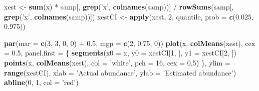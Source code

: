 \documentclass[]{article}
\newenvironment{Shaded}{\begin{snugshade}}{\end{snugshade}}
\newcommand{\KeywordTok}[1]{\textcolor[rgb]{0.13,0.29,0.53}{\textbf{{#1}}}}
\newcommand{\DataTypeTok}[1]{\textcolor[rgb]{0.13,0.29,0.53}{{#1}}}
\newcommand{\DecValTok}[1]{\textcolor[rgb]{0.00,0.00,0.81}{{#1}}}
\newcommand{\FloatTok}[1]{\textcolor[rgb]{0.00,0.00,0.81}{{#1}}}
\newcommand{\StringTok}[1]{\textcolor[rgb]{0.31,0.60,0.02}{{#1}}}
\newcommand{\NormalTok}[1]{{#1}}
\begin{document}
\begin{Shaded}
\begin{Highlighting}[]
\NormalTok{xest <-}\StringTok{ }\KeywordTok{sum}\NormalTok{(x) *}\StringTok{ }\NormalTok{samp[, }\KeywordTok{grep}\NormalTok{(}\StringTok{'x'}\NormalTok{, }\KeywordTok{colnames}\NormalTok{(samp))] /}\StringTok{ }
\StringTok{    }\KeywordTok{rowSums}\NormalTok{(samp[, }\KeywordTok{grep}\NormalTok{(}\StringTok{'x'}\NormalTok{, }\KeywordTok{colnames}\NormalTok{(samp))])}
\NormalTok{xestCI <-}\StringTok{ }\KeywordTok{apply}\NormalTok{(xest, }\DecValTok{2}\NormalTok{, quantile, }\DataTypeTok{prob =} \KeywordTok{c}\NormalTok{(}\FloatTok{0.025}\NormalTok{, }\FloatTok{0.975}\NormalTok{))}

\KeywordTok{par}\NormalTok{(}\DataTypeTok{mar =} \KeywordTok{c}\NormalTok{(}\DecValTok{3}\NormalTok{, }\DecValTok{3}\NormalTok{, }\DecValTok{0}\NormalTok{, }\DecValTok{0}\NormalTok{) +}\StringTok{ }\FloatTok{0.5}\NormalTok{, }\DataTypeTok{mgp =} \KeywordTok{c}\NormalTok{(}\DecValTok{2}\NormalTok{, }\FloatTok{0.75}\NormalTok{, }\DecValTok{0}\NormalTok{))}
\KeywordTok{plot}\NormalTok{(x, }\KeywordTok{colMeans}\NormalTok{(xest), }\DataTypeTok{cex =} \FloatTok{0.5}\NormalTok{,}
     \DataTypeTok{panel.first =} \NormalTok{\{}
         \KeywordTok{segments}\NormalTok{(}\DataTypeTok{x0 =} \NormalTok{x, }\DataTypeTok{y0 =} \NormalTok{xestCI[}\DecValTok{1}\NormalTok{, ], }\DataTypeTok{y1 =} \NormalTok{xestCI[}\DecValTok{2}\NormalTok{, ])}
         \KeywordTok{points}\NormalTok{(x, }\KeywordTok{colMeans}\NormalTok{(xest), }\DataTypeTok{col =} \StringTok{'white'}\NormalTok{, }\DataTypeTok{pch =} \DecValTok{16}\NormalTok{, }\DataTypeTok{cex =} \FloatTok{0.5}\NormalTok{)}
     \NormalTok{\}, }
     \DataTypeTok{ylim =} \KeywordTok{range}\NormalTok{(xestCI), }
     \DataTypeTok{xlab =} \StringTok{'Actual abundance'}\NormalTok{, }\DataTypeTok{ylab =} \StringTok{'Estimated abundance'}\NormalTok{)}
\KeywordTok{abline}\NormalTok{(}\DecValTok{0}\NormalTok{, }\DecValTok{1}\NormalTok{, }\DataTypeTok{col =} \StringTok{'red'}\NormalTok{)}
\end{Highlighting}
\end{Shaded}
\end{document}
